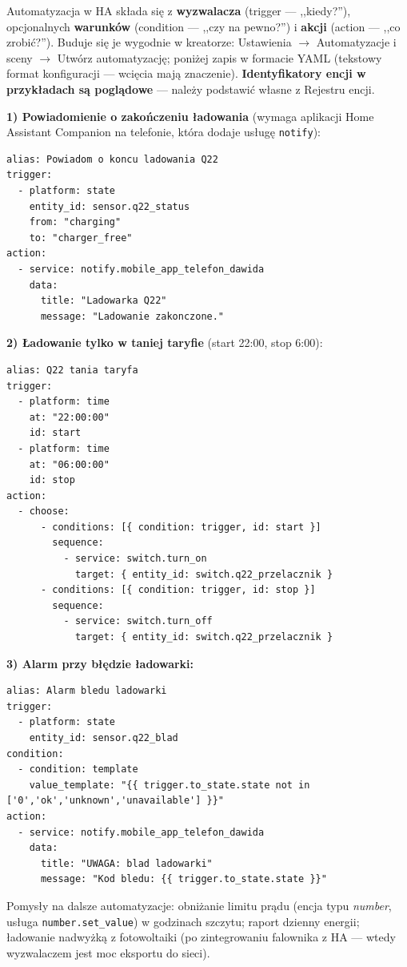 \documentclass[11pt,a4paper]{article}
\begin{document}
Automatyzacja w HA składa się z \textbf{wyzwalacza} (trigger --- ,,kiedy?''), opcjonalnych \textbf{warunków} (condition --- ,,czy na pewno?'') i \textbf{akcji} (action --- ,,co zrobić?''). Buduje się je wygodnie w kreatorze: Ustawienia $\to$ Automatyzacje i sceny $\to$ Utwórz automatyzację; poniżej zapis w formacie YAML (tekstowy format konfiguracji --- wcięcia mają znaczenie). \textbf{Identyfikatory encji w przykładach są poglądowe} --- należy podstawić własne z Rejestru encji.

\textbf{1) Powiadomienie o zakończeniu ładowania} (wymaga aplikacji Home Assistant Companion na telefonie, która dodaje usługę \texttt{notify}):

\begin{lstlisting}
alias: Powiadom o koncu ladowania Q22
trigger:
  - platform: state
    entity_id: sensor.q22_status
    from: "charging"
    to: "charger_free"
action:
  - service: notify.mobile_app_telefon_dawida
    data:
      title: "Ladowarka Q22"
      message: "Ladowanie zakonczone."
\end{lstlisting}

\textbf{2) Ładowanie tylko w taniej taryfie} (start 22:00, stop 6:00):

\begin{lstlisting}
alias: Q22 tania taryfa
trigger:
  - platform: time
    at: "22:00:00"
    id: start
  - platform: time
    at: "06:00:00"
    id: stop
action:
  - choose:
      - conditions: [{ condition: trigger, id: start }]
        sequence:
          - service: switch.turn_on
            target: { entity_id: switch.q22_przelacznik }
      - conditions: [{ condition: trigger, id: stop }]
        sequence:
          - service: switch.turn_off
            target: { entity_id: switch.q22_przelacznik }
\end{lstlisting}

\textbf{3) Alarm przy błędzie ładowarki:}

\begin{lstlisting}
alias: Alarm bledu ladowarki
trigger:
  - platform: state
    entity_id: sensor.q22_blad
condition:
  - condition: template
    value_template: "{{ trigger.to_state.state not in ['0','ok','unknown','unavailable'] }}"
action:
  - service: notify.mobile_app_telefon_dawida
    data:
      title: "UWAGA: blad ladowarki"
      message: "Kod bledu: {{ trigger.to_state.state }}"
\end{lstlisting}

Pomysły na dalsze automatyzacje: obniżanie limitu prądu (encja typu \emph{number}, usługa \texttt{number.set\_value}) w godzinach szczytu; raport dzienny energii; ładowanie nadwyżką z fotowoltaiki (po zintegrowaniu falownika z HA --- wtedy wyzwalaczem jest moc eksportu do sieci).
\end{document}
